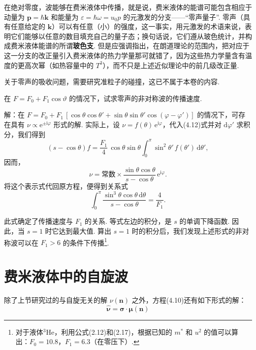 在绝对零度，波能够在费米液体中传播，就是说，费米液体的能谱可能包含相应于动量为 $\bm p=\hbar\bm k$ 和能量为 $\varepsilon=\hbar\omega=u_{0}p$ 的元激发的分支——“零声量子”. 零声（具有任意给定的 $\bm k$）可以有任意（小）的强度，这一事实，用元激发的术语来说，表明它们能够以任意的数目填充自己的量子态；换句话说，它们遵从玻色统计，并构成费米液体能谱的所谓\textbf{玻色支}. 但是应强调指出，在朗道理论的范围内，把对应于这一分支的改正量引入费米液体的热力学量那可就错了，因为这些热力学量含有温度的更高次幂（如热容量中的 $T^{3}$），而不只是上述近似理论中的前几级改正量.

关于零声的吸收问题，需要研究准粒子的碰撞，这已不属于本卷的内容.

\begin{xiti}
在 $F=F_{0}+F_{1}\cos\vartheta$ 的情况下，试求零声的非对称波的传播速度.

解：在 $F=F_{0}+F_{1}\,[\cos\theta\cos\theta'+\sin\theta\sin\theta'\cos(\varphi-\varphi')]$ 的情况下，可存在具有 $\nu\propto\mathrm{e}^{\pm\mathrm{i}\varphi}$ 形式的解. 实际上，设 $\nu=f(\theta)\,\mathrm{e}^{\mathrm{i}\varphi}$，代入(4.12)式并对 $\mathrm{d}\varphi'$ 求积分，我们得到
\begin{equation*}
(s-\cos\theta)f=\frac{F_{1}}{4}\,\cos\theta\sin\theta\int_{0}^{\pi}\sin^{2}\theta'\,f(\theta')\,\mathrm{d}\theta',
\end{equation*}
因而，
\begin{equation*}
\nu=\text{常数}\times\frac{\sin\theta\cos\theta}{s-\cos\theta}\,\mathrm{e}^{\mathrm{i}\varphi}.
\end{equation*}
将这个表示式代回原方程，便得到关系式
\begin{equation*}
\int_{0}^{\pi}\frac{\sin^{3}\theta\cos\theta\,\mathrm{d}\theta}{s-\cos\theta}=\frac{4}{F_{1}}.
\end{equation*}

此式确定了传播速度与 $F_{1}$ 的关系. 等式左边的积分，是 $s$ 的单调下降函数. 因此，当 $s=1$ 时它达到最大值. 算出 $s=1$ 时的积分后，我们发现上述形式的非对称波可以在 $F_{1}>6$ 的条件下传播\footnote{对于液体$^{3}$He，利用公式(2.12)和(2.17)，根据已知的 $m^{*}$ 和 $u^{2}$ 的值可以算出：$F_{0}=10.8$，$F_{1}=6.3$（在零压下）.}.
\end{xiti}

\section{费米液体中的自旋波}

除了上节研究过的与自旋无关的解 $\nu(\bm n)$ 之外，方程(4.10)还有如下形式的解：
\begin{equation}
\hat{\bm\nu}=\bm\sigma\cdot\bm\mu(\bm n)
\end{equation}

